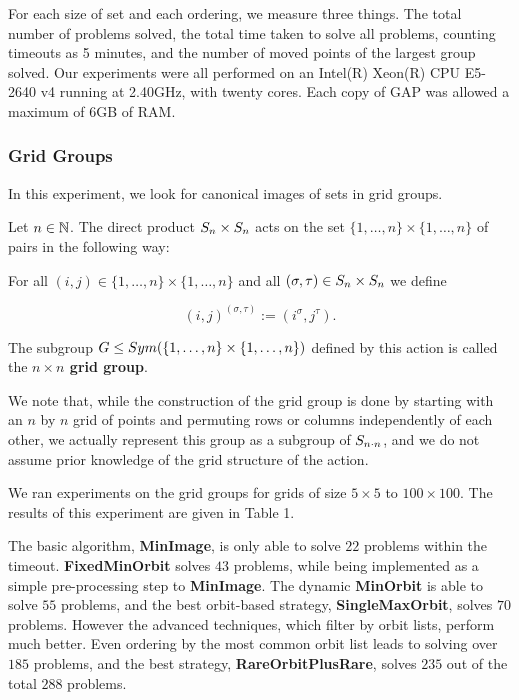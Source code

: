 For each size of set and each ordering, we measure three things. The total number
of problems solved, the total time taken to solve all problems, counting
timeouts as 5 minutes, and the number of moved points of the largest group
solved. Our experiments were all performed on an Intel(R) Xeon(R) CPU E5-2640 v4
running at 2.40GHz, with twenty cores. Each copy of GAP was allowed a maximum of
6GB of RAM.

\subsubsection{Grid Groups}

In this experiment, we look for canonical images of sets in grid groups.

\begin{defi}\label{def:gridgroup}
  Let $n \in \mathbb{N}$. The direct product $S_{n} \times S_{n}$ acts on the set
  $\{1,\ldots, n\} \times \{1,\ldots, n\}$ of pairs in the following way:

  For all $(i,j) \in  \{1,\ldots, n\} \times \{1,\ldots, n\}$
  and all $(\sigma,\tau) \in S_{n} \times S_{n}$ we define

  \[
    {(i,j)}^{(\sigma,\tau)} := (i^{\sigma}, j^{\tau}).
  \]

  The subgroup $G \le Sym(\{1,\ldots, n\} \times \{1,\ldots, n\})$ defined by this
  action is called the \textbf{$n \times n$ grid group}.
\end{defi}

We note that, while the construction of the grid group is done by starting with
an $n$ by $n$ grid of points and permuting rows or columns independently of each
other, we actually represent this group as a subgroup of $S_{n\cdot n}$, and we
do not assume prior knowledge of the grid structure of the action.

We ran experiments on the grid groups for grids of size \(5 \times 5\) to \(100 \times
100\). The results of this experiment
are given in Table 1.

The basic algorithm, \textbf{MinImage}, is only able to solve \(22\) problems
within the timeout. \textbf{FixedMinOrbit} solves \(43\) problems, while being
implemented as a simple pre-processing step to \textbf{MinImage}. The dynamic
\textbf{MinOrbit} is able to solve \(55\) problems, and the best orbit-based
strategy, \textbf{SingleMaxOrbit}, solves \(70\) problems. However the advanced
techniques, which filter by orbit lists, perform much better.
Even ordering by the most common orbit list leads to solving over \(185\)
problems, and the best strategy, \textbf{RareOrbitPlusRare}, solves \(235\)
out of the total \(288\) problems.

